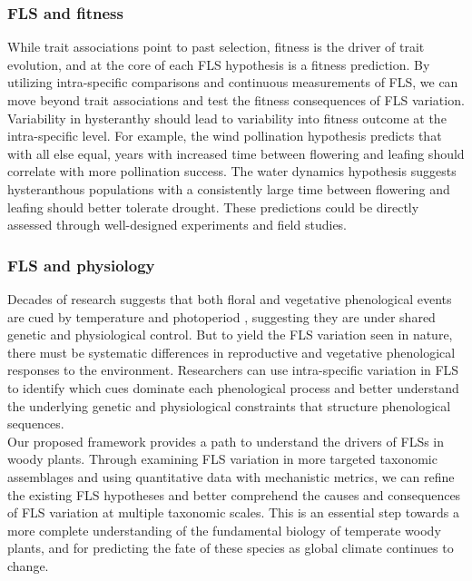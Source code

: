\documentclass[12pt]{article}\usepackage[]{graphicx}\usepackage[]{color}
\begin{document}
\subsubsection*{FLS and fitness}
\indent\indent While trait associations point to past selection, fitness is the driver of trait evolution, and at the core of each FLS hypothesis is a fitness prediction. By utilizing intra-specific comparisons and continuous measurements of FLS, we can move beyond trait associations and test the fitness consequences of FLS variation. \\
\indent Variability in hysteranthy should lead to variability into fitness outcome at the intra-specific level. For example, the wind pollination hypothesis predicts that with all else equal, years with increased time between flowering and leafing should correlate with more pollination success. The water dynamics hypothesis suggests hysteranthous populations with a consistently large time between flowering and leafing should better tolerate drought. These predictions could be directly assessed through well-designed experiments and field studies.\\
\subsubsection*{FLS and physiology} 
\indent\indent Decades of research suggests that both floral and vegetative phenological events are cued by temperature and photoperiod \citep{Forrest2010, Flynn2018}, suggesting they are under shared genetic and physiological control. But to yield the FLS variation seen in nature, there must be systematic differences in reproductive and vegetative phenological responses to the environment. Researchers can use intra-specific variation in FLS to identify which cues dominate each phenological process and better understand the underlying genetic and physiological constraints that structure phenological sequences.\\

\indent Our proposed framework provides a path to understand the drivers of FLSs in woody plants. Through examining FLS variation in more targeted taxonomic assemblages and using quantitative data with mechanistic metrics, we can refine the existing FLS hypotheses and better comprehend the causes and consequences of FLS variation at multiple taxonomic scales. This is an essential step towards a more complete understanding of the fundamental biology of temperate woody plants, and for predicting the fate of these species as global climate continues to change.
\end{document}
